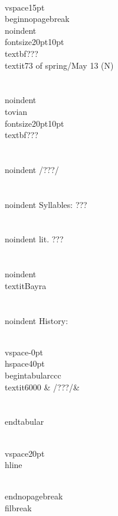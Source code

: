 \\vspace{15pt}
\\begin{nopagebreak}
\\noindent{\\fontsize{20pt}{10pt}\\textbf{???} } \\textit{73 of spring/May 13} (N)\\\\
\\noindent {\\tovian \\fontsize{20pt}{10pt} \\textbf{???} }\\\\
\\noindent /???/\\\\
\\noindent Syllables: ???\\\\
\\noindent lit. ???\\\\
\\noindent \\textit{Bayra}\\\\


\\noindent History:

\\vspace{-0pt}
\\hspace{40pt}
\\begin{tabular}{ccc}
\\textit{6000} & /???/& \\\\
\\end{tabular}

\\vspace{20pt}\\hline

\\end{nopagebreak}
\\filbreak



